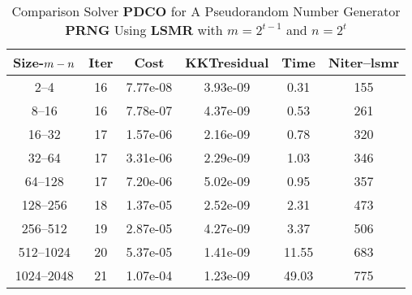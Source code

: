 \documentclass[letterpaper,12pt,oneside,final]{book}
\begin{document}
\begin{table}
\caption{Comparison Solver   {\bf PDCO} for  A Pseudorandom Number Generator {\bf PRNG } Using {\bf LSMR} with  $m=2^{t-1}$ and $n=2^{t}$} 
\begin{center}
\begin{tabular}{|*{6}{c}|} \hline
Size-$m\--n$ & \multicolumn{1}{c}{Iter} & \multicolumn{1}{c}{Cost}& \multicolumn{1}{c}{KKTresidual} & \multicolumn{1}{c}{Time} & \multicolumn{1}{c|}{Niter--lsmr} \\ 
\hline
2--4 &16& 7.77e-08& 3.93e-09& 0.31& 155 \\ 
8--16 &16& 7.78e-07& 4.37e-09& 0.53& 261 \\ 
16--32 &17& 1.57e-06& 2.16e-09& 0.78& 320 \\ 
32--64 &17& 3.31e-06& 2.29e-09& 1.03& 346 \\ 
64--128 &17& 7.20e-06& 5.02e-09& 0.95& 357 \\ 
128--256 &18& 1.37e-05& 2.52e-09& 2.31& 473 \\ 
256--512 &19& 2.87e-05& 4.27e-09& 3.37& 506 \\ 
512--1024 &20& 5.37e-05& 1.41e-09& 11.55& 683 \\ 
1024--2048 &21& 1.07e-04& 1.23e-09& 49.03& 775 \\
\hline
\end{tabular}
\end{center}
\end{table}
\end{document}
